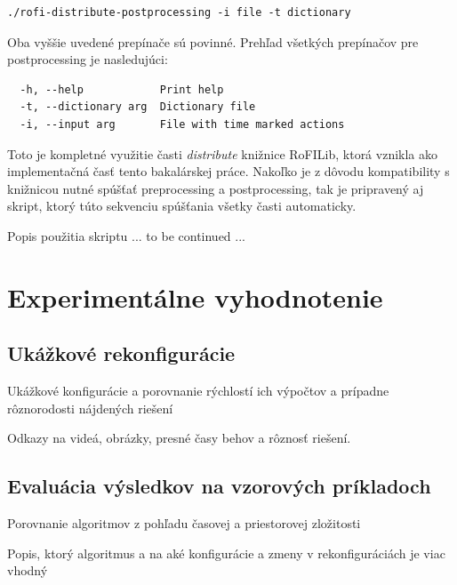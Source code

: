 \documentclass[
  digital, %
  oneside, %
  table,   %
  lof,     %
  nolot,     %
]{fithesis3}
\begin{document}
\begin{verbatim}
./rofi-distribute-postprocessing -i file -t dictionary
\end{verbatim}

Oba vyššie uvedené prepínače sú povinné. Prehľad všetkých prepínačov pre postprocessing je nasledujúci: 

\begin{verbatim}
  -h, --help            Print help
  -t, --dictionary arg  Dictionary file
  -i, --input arg       File with time marked actions 
\end{verbatim}

Toto je kompletné využitie časti \textit{distribute} knižnice RoFILib, ktorá vznikla ako implementačná časť tento bakalárskej práce. Nakoľko je z dôvodu kompatibility s knižnicou nutné spúšťať preprocessing a postprocessing, tak je pripravený aj skript, ktorý túto sekvenciu spúšťania všetky časti automaticky. 

Popis použitia skriptu ... to be continued ...










\chapter{Experimentálne vyhodnotenie}
\section{Ukážkové rekonfigurácie}
Ukážkové konfigurácie a porovnanie rýchlostí ich výpočtov a prípadne rôznorodosti nájdených riešení

Odkazy na videá, obrázky, presné časy behov a rôznosť riešení. 
\section{Evaluácia výsledkov na vzorových príkladoch}
Porovnanie algoritmov z pohľadu časovej a priestorovej zložitosti

Popis, ktorý algoritmus a na aké konfigurácie a zmeny v rekonfiguráciách je viac vhodný

\end{document}
